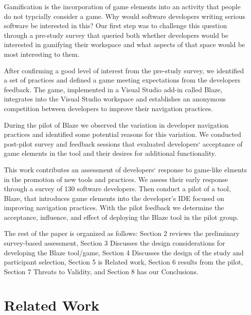 \documentclass{sig-alternate}
\begin{document}
Gamification is the incorporation of game elements into an activity that people do not typcially consider a game\cite{2013Oxford}.  Why would software developers writing serious software be interested in this?  Our first step was to challenge this question through a pre-study survey that queried both whether developers would be interested in gamifying their workspace and what aspects of that space would be most interesting to them.

After confirming a good level of interest from the pre-study survey, we identified a set of practices and defined a game meeting expectations from the developers feedback.  The game, implemented in a Visual Studio add-in called Blaze, integrates into the Visual Studio workspace and establishes an anonymous competition between developers to improve their navigation practices. 

During the pilot of Blaze we observed the variation in developer navigation practices and identified some potential reasons for this variation.  We conducted post-pilot survey and feedback sessions that evaluated developers` acceptance of game elements in the tool and their desires for additional functionality.  

This work contributes an assessment of developers` response to game-like elments in the promotion of new tools and practices.  We assess their early response through a survey of 130 software developers.  Then conduct a pilot of a tool, Blaze, that introduces game elements into the developer's IDE focused on improving navigation practices.  With the pilot feedback we determine the acceptance, influence, and effect of deploying the Blaze tool in the pilot group.

The rest of the paper is organized as follows:  Section 2 reviews the preliminary survey-based assessment, Section 3 Discusses the design considerations for developing the Blaze tool/game, Section 4 Discusses the design of the study and participant selection, Section 5 is Related work, Section 6 results from the pilot, Section 7 Threats to Validity, and Section 8 has our Conclusions.


\section{Related Work}
\end{document}
